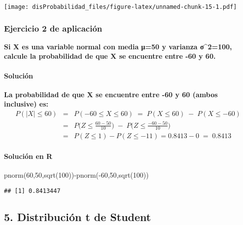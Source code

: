 \documentclass[
]{article}
\newenvironment{Shaded}{\begin{snugshade}}{\end{snugshade}}
\newcommand{\DecValTok}[1]{\textcolor[rgb]{0.00,0.00,0.81}{#1}}
\newcommand{\FunctionTok}[1]{\textcolor[rgb]{0.00,0.00,0.00}{#1}}
\newcommand{\NormalTok}[1]{#1}
\newcommand{\SpecialCharTok}[1]{\textcolor[rgb]{0.00,0.00,0.00}{#1}}
\begin{document}
\texttt{[image: disProbabilidad\_files/figure-latex/unnamed-chunk-15-1.pdf]}

\hypertarget{ejercicio-2-de-aplicaciuxf3n}{%
\subsubsection{Ejercicio 2 de
aplicación}\label{ejercicio-2-de-aplicaciuxf3n}}

\textbf{Si X es una variable normal con media μ=50 y varianza
σ\^{}2=100, calcule la probabilidad de que X se encuentre entre -60 y
60.}

\hypertarget{soluciuxf3n-4}{%
\paragraph{Solución}\label{soluciuxf3n-4}}

\textbf{La probabilidad de que X se encuentre entre -60 y 60 (ambos
inclusive) es:} \begin{eqnarray*}
    P(|X| \leq 60) &=& P(-60 \leq X  \leq 60)\; =\;  P(X\leq 60) \; - \; P(X\leq -60) \\
     &=&  P\Big(Z \leq \frac{60-50}{10}\Big) \; - \;  P\Big(Z \leq \frac{-60-50}{10}\Big)\\
     &=& P(Z \leq 1) - P(Z\leq -11) = 0.8413  - 0 \; =\; 0.8413
\end{eqnarray*}

\hypertarget{soluciuxf3n-en-r}{%
\paragraph{Solución en R}\label{soluciuxf3n-en-r}}

\begin{Shaded}
\begin{Highlighting}[]
\FunctionTok{pnorm}\NormalTok{(}\DecValTok{60}\NormalTok{,}\DecValTok{50}\NormalTok{,}\FunctionTok{sqrt}\NormalTok{(}\DecValTok{100}\NormalTok{))}\SpecialCharTok{{-}}\FunctionTok{pnorm}\NormalTok{(}\SpecialCharTok{{-}}\DecValTok{60}\NormalTok{,}\DecValTok{50}\NormalTok{,}\FunctionTok{sqrt}\NormalTok{(}\DecValTok{100}\NormalTok{))}
\end{Highlighting}
\end{Shaded}

\begin{verbatim}
## [1] 0.8413447
\end{verbatim}

\hypertarget{distribuciuxf3n-t-de-student}{%
\subsection{5. Distribución t de
Student}\label{distribuciuxf3n-t-de-student}}
\end{document}
